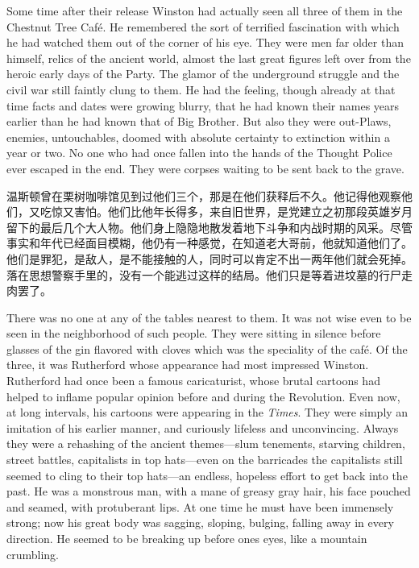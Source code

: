 \begin{paracol}{2}
Some time after their release Winston had actually seen all three of
them in the Chestnut Tree Café. He remembered the sort of terrified
fascination with which he had watched them out of the corner of his eye.
They were men far older than himself, relics of the ancient world,
almost the last great figures left over from the heroic early days of
the Party. The glamor of the underground struggle and the civil war
still faintly clung to them. He had the feeling, though already at that
time facts and dates were growing blurry, that he had known their names
years earlier than he had known that of Big Brother. But also they were
out-Plaws, enemies, untouchables, doomed with absolute certainty to
extinction within a year or two. No one who had once fallen into the
hands of the Thought Police ever escaped in the end. They were corpses
waiting to be sent back to the grave.

\switchcolumn

温斯顿曾在栗树咖啡馆见到过他们三个，那是在他们获释后不久。他记得他观察他们，又吃惊又害怕。他们比他年长得多，来自旧世界，是党建立之初那段英雄岁月留下的最后几个大人物。他们身上隐隐地散发着地下斗争和内战时期的风采。尽管事实和年代已经面目模糊，他仍有一种感觉，在知道老大哥前，他就知道他们了。他们是罪犯，是敌人，是不能接触的人，同时可以肯定不出一两年他们就会死掉。落在思想警察手里的，没有一个能逃过这样的结局。他们只是等着进坟墓的行尸走肉罢了。

\switchcolumn*

There was no one at any of the tables nearest to them. It was not wise
even to be seen in the neighborhood of such people. They were sitting in
silence before glasses of the gin flavored with cloves which was the
speciality of the café. Of the three, it was Rutherford whose appearance
had most impressed Winston. Rutherford had once been a famous
caricaturist, whose brutal cartoons had helped to inflame popular
opinion before and during the Revolution. Even now, at long intervals,
his cartoons were appearing in the \emph{Times}. They were simply an
imitation of his earlier manner, and curiously lifeless and
unconvincing. Always they were a rehashing of the ancient themes---slum
tenements, starving children, street battles, capitalists in top
hats---even on the barricades the capitalists still seemed to cling to
their top hats---an endless, hopeless effort to get back into the past.
He was a monstrous man, with a mane of greasy gray hair, his face
pouched and seamed, with protuberant lips. At one time he must have been
immensely strong; now his great body was sagging, sloping, bulging,
falling away in every direction. He seemed to be breaking up before
one\textquotesingle s eyes, like a mountain crumbling.


\end{paracol}
